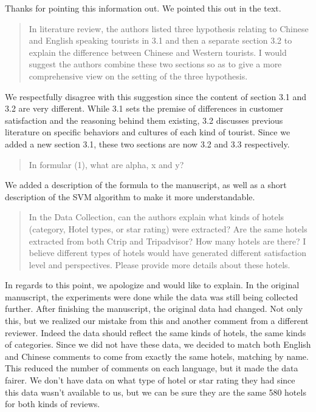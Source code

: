 \documentclass{letter}
\begin{document}
Thanks for pointing this information out. We pointed this out in the text.


\begin{quotation}
In literature review, the authors listed three hypothesis relating to Chinese and English speaking tourists in 3.1 and then a separate section 3.2 to explain the difference between Chinese and Western tourists. I would suggest the authors combine these two sections so as to give a more comprehensive view on the setting of the three hypothesis.
\end{quotation}

We respectfully disagree with this suggestion since the content of section 3.1 and 3.2 are very different. While 3.1 sets the premise of differences in customer satisfaction and the reasoning behind them existing, 3.2 discusses previous literature on specific behaviors and cultures of each kind of tourist. Since we added a new section 3.1, these two sections are now 3.2 and 3.3 respectively.


\begin{quotation}
In formular (1), what are alpha, x and y?
\end{quotation}

We added a description of the formula to the manuscript, as well as a short description of the SVM algorithm to make it more understandable.


\begin{quotation}
In the Data Collection, can the authors explain what kinds of hotels (category, Hotel types, or star rating) were extracted? Are the same hotels extracted from both Ctrip and Tripadvisor? How many hotels are there? I believe different types of hotels would have generated different satisfaction level and perspectives. Please provide more details about these hotels.
\end{quotation}

In regards to this point, we apologize and would like to explain. In the original manuscript, the experiments were done while the data was still being collected further. After finishing the manuscript, the original data had changed. Not only this, but we realized our mistake from this and another comment from a different reviewer. Indeed the data should reflect the same kinds of hotels, the same kinds of categories. Since we did not have these data, we decided to match both English and Chinese comments to come from exactly the same hotels, matching by name. This reduced the number of comments on each language, but it made the data fairer. We don't have data on what type of hotel or star rating they had since this data wasn't available to us, but we can be sure they are the same 580 hotels for both kinds of reviews. 
\end{document}
